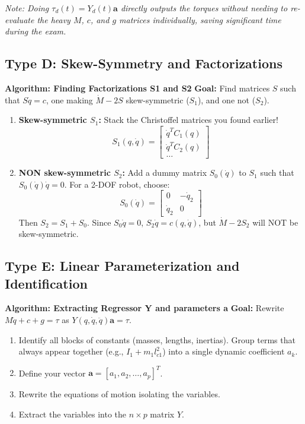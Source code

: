 \documentclass[11pt,a4paper]{article}
\begin{document}
\textit{Note: Doing $\tau_d(t) = Y_d(t) \mathbf{a}$ directly outputs the torques without needing to re-evaluate the heavy $M$, $c$, and $g$ matrices individually, saving significant time during the exam.}
\subsection{Type D: Skew-Symmetry and Factorizations}

 \textbf{Algorithm: Finding Factorizations S1 and S2}
\textbf{Goal:} Find matrices $S$ such that $S \dot{q} = c$, one making $\dot{M} - 2S$ skew-symmetric ($S_1$), and one not ($S_2$).
\begin{enumerate}
    \item \textbf{Skew-symmetric $S_1$:} Stack the Christoffel matrices you found earlier!
    \begin{equation}
        S_1(q,\dot{q}) = \begin{bmatrix} \dot{q}^T C_1(q) \\ \dot{q}^T C_2(q) \\ \dots \end{bmatrix}
    \end{equation}
    
    \item \textbf{NON skew-symmetric $S_2$:} 
    Add a dummy matrix $S_0(\dot{q})$ to $S_1$ such that $S_0(\dot{q})\dot{q} = 0$. For a 2-DOF robot, choose:
    $$ S_0(\dot{q}) = \begin{bmatrix} 0 & -\dot{q}_2 \\ \dot{q}_2 & 0 \end{bmatrix} $$
    Then $S_2 = S_1 + S_0$. Since $S_0 \dot{q} = 0$, $S_2 \dot{q} = c(q, \dot{q})$, but $\dot{M}-2S_2$ will NOT be skew-symmetric.
\end{enumerate}
\subsection{Type E: Linear Parameterization and Identification}

 \textbf{Algorithm: Extracting Regressor Y and parameters a}
\textbf{Goal:} Rewrite $M\ddot{q} + c + g = \tau$ as $Y(q, \dot{q}, \ddot{q})\mathbf{a} = \tau$.
\begin{enumerate}
    \item Identify all blocks of constants (masses, lengths, inertias). Group terms that always appear together (e.g., $I_1 + m_1 l_{c1}^2$) into a single dynamic coefficient $a_k$.
    \item Define your vector $\mathbf{a} = [a_1, a_2, \dots, a_p]^T$.
    \item Rewrite the equations of motion isolating the variables.
    \item Extract the variables into the $n \times p$ matrix $Y$. 
\end{enumerate}
\end{document}
